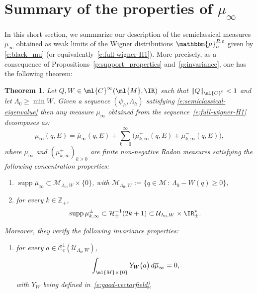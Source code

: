 \documentclass[10pt]{amsart}
\let\bm\mathbbm
\theoremstyle{plain}
\newtheorem{theo}{Theorem}[section]
\theoremstyle{definition}
\theoremstyle{remark}
\begin{document}
\section{Summary of the properties of \texorpdfstring{$\mu_\infty$}{mu}}
\label{s:main_results_and_proofs}

In this short section, we summarize our description of the semiclassical measures~$\mu_\infty$ obtained as weak limits of the Wigner distributions $\bm{\mu}_{h}^{R,\varepsilon}$ given by \eqref{e:black_mu} (or equivalently~\eqref{e:full-wigner-H1}). More precisely, as a consequence of Propositions~\ref{p:support_properties} and~\ref{p:invariance}, one has the following theorem:


\begin{theo}\label{t:maintheo} Let $Q,W\in\ml{C}^\infty(\ml{M},\IR)$ such that $\|Q\|_{\ml{C}^0}<1$ and let $\Lambda_0\geq\min W$. Given a sequence $(\psi_h,\Lambda_h)$ satisfying \eqref{e:semiclassical-eigenvalue} then any measure $\mu_\infty$ obtained from the sequence~\eqref{e:full-wigner-H1} decomposes as:
\begin{equation}
\mu_\infty(q,E) = \overline{\mu}_\infty(q,E) + \sum_{k=0}^\infty \big(\mu^+_{k,\infty}(q,E) + \mu^-_{k,\infty}(q,E) \big),
\end{equation}
where $\overline{\mu}_\infty$ and $(\mu^\pm_{k,\infty})_{k\geq 0}$ are finite non-negative Radon measures satisfying the following concentration properties:
\begin{enumerate}\renewcommand{\theenumi}{S.\arabic{enumi}}

\item
\label{i:support_1} $\operatorname{supp} \overline{\mu}_{\infty} \subset \mathcal{M}_{\Lambda_0,W} \times \{ 0 \}$,
with $\mathcal{M}_{\Lambda_0,W} := \{ q \in \mathcal{M} \, : \, \Lambda_0 - W(q) \geq 0 \}$,

\item
\label{i:support_2} for every $k \in \mathbb{Z}_+$,
\[
\operatorname{supp} \mu^\pm_{k,\infty} \subset \mathcal{H}_\pm^{-1}(2k+1) \subset\mathcal{U}_{\Lambda_0,W}\times\IR_{\pm}^*.
\]
\end{enumerate}
Moreover, they verify the following invariance properties:

\begin{enumerate}\renewcommand{\theenumi}{P.\arabic{enumi}}

\item
\label{i:invariance_1} for every $a \in \mathcal{C}^1_c(\mathcal{U}_{\Lambda_0,W})$,
\[
\int_{\ml{M}\times\{0\}} Y_W \big(a \big) \, d\overline{ \mu}_\infty = 0,
\]
with $Y_W$ being defined in~\eqref{e:good-vectorfield},


\end{enumerate}
\end{theo}
\end{document}

